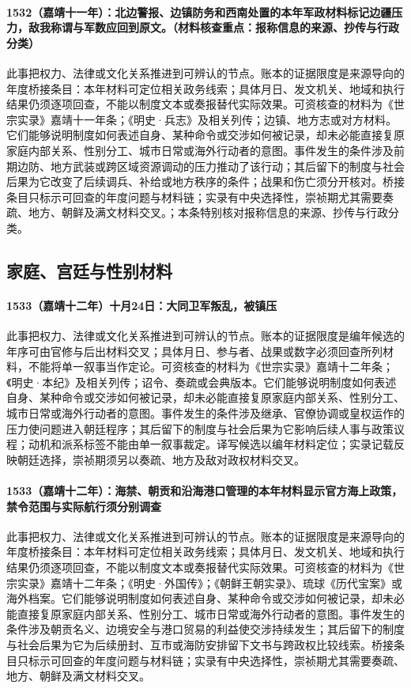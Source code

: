 \paragraph{1532（嘉靖十一年）：北边警报、边镇防务和西南处置的本年军政材料标记边疆压力，敌我称谓与军数应回到原文。（材料核查重点：报称信息的来源、抄传与行政分类）} 此事把权力、法律或文化关系推进到可辨认的节点。账本的证据限度是来源导向的年度桥接条目：本年材料可定位相关政务线索；具体月日、发文机关、地域和执行结果仍须逐项回查，不能以制度文本或奏报替代实际效果。可资核查的材料为《世宗实录》嘉靖十一年条；《明史·兵志》及相关列传；边镇、地方志或对方材料。它们能够说明制度如何表述自身、某种命令或交涉如何被记录，却未必能直接复原家庭内部关系、性别分工、城市日常或海外行动者的意图。事件发生的条件涉及前期边防、地方武装或跨区域资源调动的压力推动了该行动；其后留下的制度与社会后果为它改变了后续调兵、补给或地方秩序的条件；战果和伤亡须分开核对。桥接条目只标示可回查的年度问题与材料链；实录有中央选择性，崇祯期尤其需要奏疏、地方、朝鲜及满文材料交叉。；本条特别核对报称信息的来源、抄传与行政分类。

\subsection{家庭、宫廷与性别材料}

\paragraph{1533（嘉靖十二年）十月24日：大同卫军叛乱，被镇压} 此事把权力、法律或文化关系推进到可辨认的节点。账本的证据限度是编年候选的年序可由官修与后出材料交叉；具体月日、参与者、战果或数字必须回查所列材料，不能将单一叙事当作定论。可资核查的材料为《世宗实录》嘉靖十二年条；《明史·本纪》及相关列传；诏令、奏疏或会典版本。它们能够说明制度如何表述自身、某种命令或交涉如何被记录，却未必能直接复原家庭内部关系、性别分工、城市日常或海外行动者的意图。事件发生的条件涉及继承、官僚协调或皇权运作的压力使问题进入朝廷程序；其后留下的制度与社会后果为它影响后续人事与政策议程；动机和派系标签不能由单一叙事裁定。译写候选以编年材料定位；实录记载反映朝廷选择，崇祯期须另以奏疏、地方及敌对政权材料交叉。

\paragraph{1533（嘉靖十二年）：海禁、朝贡和沿海港口管理的本年材料显示官方海上政策，禁令范围与实际航行须分别调查} 此事把权力、法律或文化关系推进到可辨认的节点。账本的证据限度是来源导向的年度桥接条目：本年材料可定位相关政务线索；具体月日、发文机关、地域和执行结果仍须逐项回查，不能以制度文本或奏报替代实际效果。可资核查的材料为《世宗实录》嘉靖十二年条；《明史·外国传》；《朝鲜王朝实录》、琉球《历代宝案》或海外档案。它们能够说明制度如何表述自身、某种命令或交涉如何被记录，却未必能直接复原家庭内部关系、性别分工、城市日常或海外行动者的意图。事件发生的条件涉及朝贡名义、边境安全与港口贸易的利益使交涉持续发生；其后留下的制度与社会后果为它为后续册封、互市或海防安排留下文书与跨政权比较线索。桥接条目只标示可回查的年度问题与材料链；实录有中央选择性，崇祯期尤其需要奏疏、地方、朝鲜及满文材料交叉。


